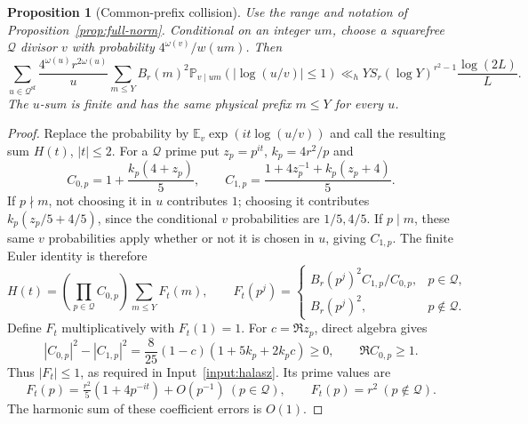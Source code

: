 \documentclass[11pt]{article}
\newtheorem{proposition}[theorem]{Proposition}
\theoremstyle{definition}
\newcommand{\E}{\mathbb E}
\newcommand{\Prob}{\mathbb P}
\theoremstyle{remark}
\numberwithin{equation}{section}
\newcommand{\Qset}{\mathcal Q}
\newcommand{\sfw}{\mathrm{sf}}
\begin{document}
\begin{proposition}[Common-prefix collision]\label{prop:external-collision}
Use the range and notation of Proposition~\ref{prop:full-norm}. Conditional on an integer $um$, choose a
squarefree $\Qset$ divisor $v$ with probability $4^{\omega(v)}/w(um)$. Then
\begin{equation}\label{eq:external-collision}
 \sum_{u\in\Qset^{\sfw}}\frac{4^{\omega(u)}r^{2\omega(u)}}u
 \sum_{m\le Y}B_r(m)^2\Prob_{v\mid um}(|\log(u/v)|\le1)
 \ll_h YS_r(\log Y)^{r^2-1}\frac{\log(2L)}L.
\end{equation}
The $u$-sum is finite and has the same physical prefix $m\le Y$ for every $u$.
\end{proposition}
\begin{proof}
Replace the probability by $\E_v\exp(it\log(u/v))$ and call the resulting sum $H(t)$, $|t|\le2$.
For a $\Qset$ prime put $z_p=p^{it}$, $k_p=4r^2/p$ and
\begin{equation}\label{eq:external-local-factors}
 C_{0,p}=1+\frac{k_p(4+z_p)}5,\qquad
 C_{1,p}=\frac{1+4z_p^{-1}+k_p(z_p+4)}5.
\end{equation}
If $p\nmid m$, not choosing it in $u$ contributes $1$; choosing it contributes
$k_p(z_p/5+4/5)$, since the conditional $v$ probabilities are $1/5,4/5$.
If $p\mid m$, these same $v$ probabilities apply whether or not it is chosen in $u$, giving $C_{1,p}$.
The finite Euler identity is therefore
\begin{equation}\label{eq:external-euler}
 H(t)=\left(\prod_{p\in\Qset}C_{0,p}\right)\sum_{m\le Y}F_t(m),\qquad
 F_t(p^j)=\begin{cases}B_r(p^j)^2C_{1,p}/C_{0,p},&p\in\Qset,\\B_r(p^j)^2,&p\notin\Qset.
 \end{cases}
\end{equation}
Define $F_t$ multiplicatively with $F_t(1)=1$.
For $c=\Re z_p$, direct algebra gives
\begin{equation}\label{eq:external-abs-identity}
 |C_{0,p}|^2-|C_{1,p}|^2=\frac8{25}(1-c)(1+5k_p+2k_pc)\ge0,\qquad \Re C_{0,p}\ge1.
\end{equation}
Thus $|F_t|\le1$, as required in Input~\ref{input:halasz}. Its prime values are
\begin{equation}\label{eq:external-prime-values}
 F_t(p)=\tfrac{r^2}5(1+4p^{-it})+O(p^{-1})\ (p\in\Qset),\qquad F_t(p)=r^2\ (p\notin\Qset).
\end{equation}
The harmonic sum of these coefficient errors is $O(1)$.


\end{proof}
\end{document}
